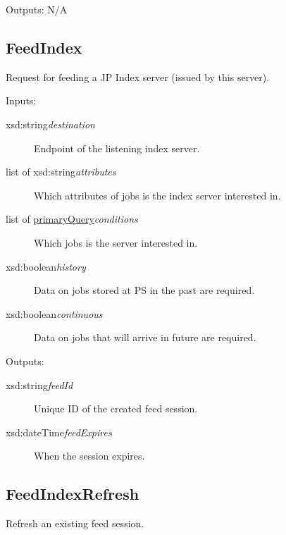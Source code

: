 Outputs: N/A
\subsection{FeedIndex}
\label{op:FeedIndex}\hypertarget{op:FeedIndex}{}%

Request for feeding a JP Index server (issued by this server).

Inputs: 
\begin{description}
\item[{xsd:string{\ttfamily\itshape{{destination}}}}]\null{}
Endpoint of the listening index server.
\item[{list of xsd:string{\ttfamily\itshape{{attributes}}}}]\null{}
Which attributes of jobs is the index server interested in.
\item[{list of \hyperlink{type:primaryQuery}{primaryQuery}{\ttfamily\itshape{{conditions}}}}]\null{}
Which jobs is the server interested in.
\item[{xsd:boolean{\ttfamily\itshape{{history}}}}]\null{}
Data on jobs stored at PS in the past are required.
\item[{xsd:boolean{\ttfamily\itshape{{continuous}}}}]\null{}
Data on jobs that will arrive in future are required.
\end{description}
\noindent 

Outputs: 
\begin{description}
\item[{xsd:string{\ttfamily\itshape{{feedId}}}}]\null{}
Unique ID of the created feed session.
\item[{xsd:dateTime{\ttfamily\itshape{{feedExpires}}}}]\null{}
When the session expires.
\end{description}
\noindent 
\subsection{FeedIndexRefresh}
\label{op:FeedIndexRefresh}\hypertarget{op:FeedIndexRefresh}{}%

Refresh an existing feed session.

